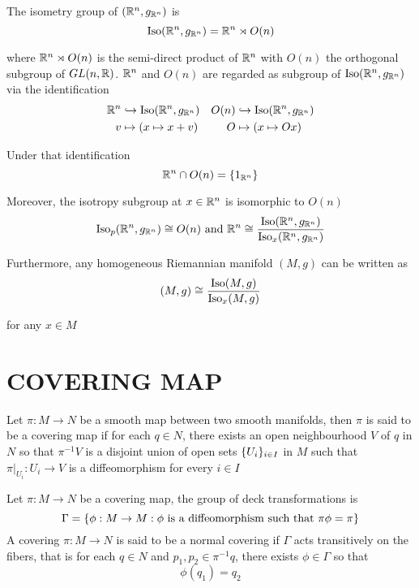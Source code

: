 \begin{remark}
	The isometry group of $(\mathbb{R}^n, g_{\mathbb{R}^n})$ is
	$$
		\operatorname{Iso}(\mathbb{R}^n, g_{\mathbb{R}^n}) = \mathbb{R}^n \rtimes O(n)
	$$
	
	where $\mathbb{R}^n \rtimes O(n)$ is the semi-direct product of $\mathbb{R}^n$ with $O(n)$ the orthogonal subgroup of $GL(n, \mathbb{R})$. $\mathbb{R}^n$ and $O(n)$ are regarded as subgroup of $\operatorname{Iso}(\mathbb{R}^n, g_{\mathbb{R}^n})$ via the identification
	\begin{align*}
		\mathbb{R}^n &\hookrightarrow \operatorname{Iso}(\mathbb{R}^n, g_{\mathbb{R}^n})
		&O(n) &\hookrightarrow \operatorname{Iso}(\mathbb{R}^n, g_{\mathbb{R}^n}) \\
		v &\mapsto (x \mapsto x + v) &O &\mapsto (x \mapsto Ox)
	\end{align*}
	
	Under that identification
	$$
		\mathbb{R}^n \cap O(n) = \{1_{\mathbb{R}^n}\}
	$$
	
	Moreover, the isotropy subgroup at $x \in \mathbb{R}^n$ is isomorphic to $O(n)$
	$$
		\operatorname{Iso}_p(\mathbb{R}^n, g_{\mathbb{R}^n}) \cong O(n) \text{ and } \mathbb{R}^n \cong \frac{\operatorname{Iso}(\mathbb{R}^n, g_{\mathbb{R}^n})}{\operatorname{Iso}_x(\mathbb{R}^n, g_{\mathbb{R}^n})}
	$$
	
	Furthermore, any homogeneous Riemannian manifold $(M, g)$ can be written as
	$$
		(M, g) \cong \frac{\operatorname{Iso}(M, g)}{\operatorname{Iso}_x(M, g)}
	$$
	
	for any $x \in M$
\end{remark}

\section{COVERING MAP}

\begin{definition}
	Let $\pi: M \to N$ be a smooth map between two smooth manifolds, then $\pi$ is said to be a covering map if for each $q \in N$, there exists an open neighbourhood $V$ of $q$ in $N$ so that $\pi^{-1}V$ is a disjoint union of open sets $\{U_i\}_{i \in I}$ in $M$ such that $\pi\vert_{U_i}: U_i \to V$ is a diffeomorphism for every $i \in I$
\end{definition}

\begin{definition}
	Let $\pi: M \to N$ be a covering map, the group of deck transformations is
	$$
		\Gamma = \{\phi: M \to M: \phi \text{ is a diffeomorphism such that } \pi \phi = \pi\}
	$$
	A covering $\pi: M \to N$ is said to be a normal covering if $\Gamma$ acts transitively on the fibers, that is for each $q \in N$ and $p_1, p_2 \in \pi^{-1} q$, there exists $\phi \in \Gamma$ so that 
	$$
		\phi(q_1) = q_2
	$$
\end{definition}

